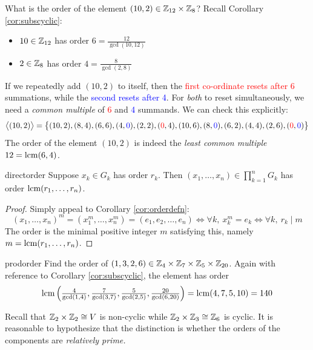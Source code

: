\begin{example}{}{}
	What is the order of the element $(10,2)\in\mathbb{Z}_{12}\times \mathbb{Z}_8$? Recall Corollary \ref{cor:subscyclic}:
	\begin{itemize}\itemsep0pt
	  \item $10\in\mathbb{Z}_{12}$ has order $6=\frac{12}{\gcd(10,12)}$
	  \item $2\in\mathbb{Z}_8$ has order $4=\frac 8{\gcd(2,8)}$
	\end{itemize}
	If we repeatedly add $(10,2)$ to itself, then the \textcolor{red}{first co-ordinate resets after 6} summations, while the \textcolor{blue}{second resets after 4}. For \emph{both} to reset simultaneously, we need a \emph{common multiple} of \textcolor{red}{6} and \textcolor{blue}{4} summands. We can check this explicitly:
	\[
		\bigl\langle(10,2)\bigr\rangle = \bigl\{(10,2), (8,4), (6,6), (4,\textcolor{blue}{0}), (2,2), (\textcolor{red}{0},4), (10,6), (8,\textcolor{blue}{0}), (6,2), (4,4), (2,6), (\textcolor{red}{0},\textcolor{blue}{0})\bigr\}
	\]
	The order of the element $(10,2)$ is indeed the \emph{least common multiple} $12=\operatorname{lcm}(6,4)$.
\end{example}


\begin{thm}{}{directorder}
	Suppose $x_k\in G_k$ has order $r_k$. Then $(x_1,\ldots,x_n)\in \prod\limits_{k=1}^n G_k$ has order $\operatorname{lcm}(r_1,\ldots,r_n)$.
\end{thm}

\begin{proof}
	Simply appeal to Corollary \ref{cor:orderdefn}:
	\[
		(x_1,\ldots,x_n)^m=(x_1^m,\ldots,x_n^m)=(e_1,e_2,\ldots,e_n)\iff \forall k,\ x_k^m=e_k \iff \forall k,\ r_k\mid m
	\]
	The order is the minimal positive integer $m$ satisfying this, namely $m=\operatorname{lcm}(r_1,\ldots,r_n)$.
\end{proof}



\begin{example}{}{prodorder}
	Find the order of $(1,3,2,6)\in\mathbb{Z}_4\times\mathbb{Z}_7\times\mathbb{Z}_5\times\mathbb{Z}_{20}$.\smallbreak
	Again with reference to Corollary \ref{cor:subscyclic}, the element has order
	\[
		\operatorname{lcm}\left(\tfrac 4{\gcd(1,4)}, \tfrac 7{\gcd(3,7)}, \tfrac 5{\gcd(2,5)}, \tfrac{20}{\gcd(6,20)}\right) =\operatorname{lcm}(4,7,5,10)=140
	\]
\end{example}



Recall that $\mathbb{Z}_2\times\mathbb{Z}_2\cong V$ is non-cyclic while $\mathbb{Z}_2\times\mathbb{Z}_3\cong \mathbb{Z}_6$ is cyclic. It is reasonable to hypothesize that the distinction is whether the orders of the components are \emph{relatively prime.} 


